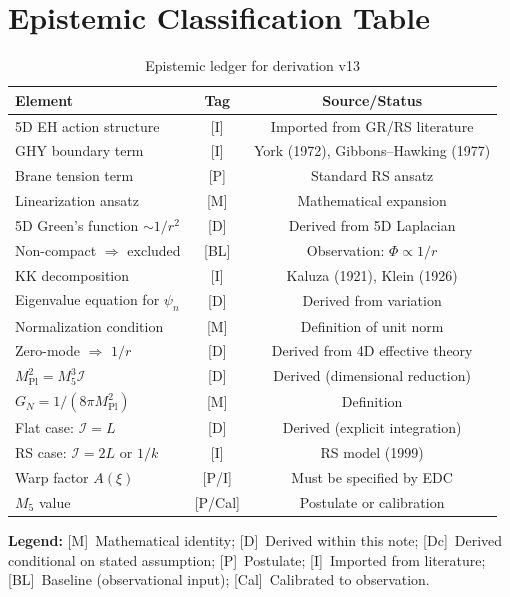 \documentclass[11pt,a4paper]{article}
\newcommand{\Mpl}{M_{\text{Pl}}}
\newcommand{\Mfive}{M_5}
\newcommand{\GN}{G_N}
\newcommand{\calI}{\mathcal{I}}
\begin{document}
\section{Epistemic Classification Table}
\label{sec:epistemic}

\begin{table}[h]
\centering
\caption{Epistemic ledger for derivation v13}
\label{tab:epistemic}
\begin{tabular}{@{}lcc@{}}
\toprule
\textbf{Element} & \textbf{Tag} & \textbf{Source/Status} \\
\midrule
5D EH action structure & [I] & Imported from GR/RS literature \\
GHY boundary term & [I] & York (1972), Gibbons--Hawking (1977) \\
Brane tension term & [P] & Standard RS ansatz \\
Linearization ansatz & [M] & Mathematical expansion \\
5D Green's function $\sim 1/r^2$ & [D] & Derived from 5D Laplacian \\
Non-compact $\Rightarrow$ excluded & [BL] & Observation: $\Phi \propto 1/r$ \\
KK decomposition & [I] & Kaluza (1921), Klein (1926) \\
Eigenvalue equation for $\psi_n$ & [D] & Derived from variation \\
Normalization condition & [M] & Definition of unit norm \\
Zero-mode $\Rightarrow$ $1/r$ & [D] & Derived from 4D effective theory \\
$\Mpl^2 = \Mfive^3 \calI$ & [D] & Derived (dimensional reduction) \\
$\GN = 1/(8\pi\Mpl^2)$ & [M] & Definition \\
Flat case: $\calI = L$ & [D] & Derived (explicit integration) \\
RS case: $\calI = 2L$ or $1/k$ & [I] & RS model (1999) \\
Warp factor $A(\xi)$ & [P/I] & Must be specified by EDC \\
$\Mfive$ value & [P/Cal] & Postulate or calibration \\
\bottomrule
\end{tabular}
\end{table}

\noindent
\textbf{Legend:}
[M]~Mathematical identity;
[D]~Derived within this note;
[Dc]~Derived conditional on stated assumption;
[P]~Postulate;
[I]~Imported from literature;
[BL]~Baseline (observational input);
[Cal]~Calibrated to observation.
\end{document}
